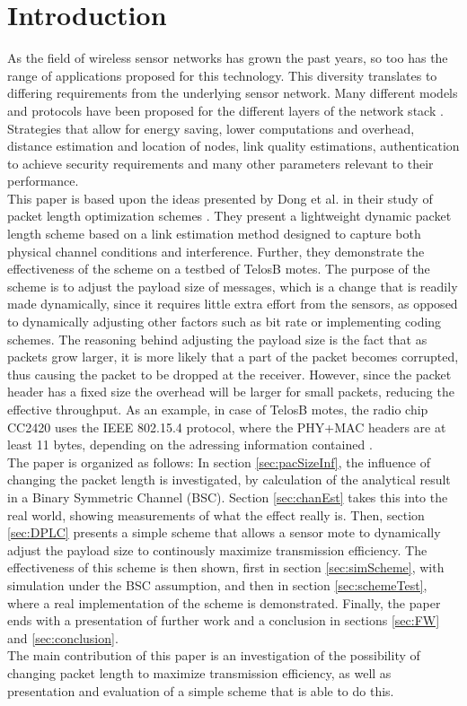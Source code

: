 \section{Introduction}\label{sec:intro}
As the field of wireless sensor networks has grown the past years, so too has the range of applications proposed for this technology. This diversity translates to differing requirements from the underlying sensor network. Many different models and protocols have been proposed for the different layers of the
network stack \cite{WSNpaper}. Strategies that allow for energy saving, lower computations  and overhead, distance estimation and location of nodes, link quality estimations, authentication to achieve security requirements and many other parameters relevant to their performance.
\\[8pt]
This paper is based upon the ideas presented by Dong et al. in their study of packet length optimization schemes \cite{DPLCpaper}. They present a lightweight dynamic packet length scheme based on a link estimation method designed to capture both physical channel conditions and interference. Further, they demonstrate the effectiveness of the scheme on a testbed of TelosB motes. The purpose of the scheme is to adjust the payload size of messages, which is a change that is readily made dynamically, since it requires little extra effort from the sensors, as opposed to dynamically adjusting other factors such as bit rate or implementing coding schemes. The reasoning behind adjusting the payload size is the fact that as packets grow larger, it is more likely that a part of the packet becomes corrupted, thus causing the packet to be dropped at the receiver. However, since the packet header has a fixed size the overhead will be larger for small packets, reducing the effective throughput. As an example, in case of TelosB motes, the radio chip CC2420 uses the IEEE 802.15.4 protocol, where the PHY+MAC headers are at least 11 bytes, depending on the adressing information contained \cite{CC2420}.
\\[8pt]
The paper is organized as follows: In section \ref{sec:pacSizeInf}, the influence of changing the packet length is investigated, by calculation of the analytical result in a Binary Symmetric Channel (BSC). Section \ref{sec:chanEst} takes this into the real world, showing measurements of what the effect really is. Then, section \ref{sec:DPLC} presents a simple scheme that allows a sensor mote to dynamically adjust the payload size to continously maximize transmission efficiency. The effectiveness of this scheme is then shown, first in section \ref{sec:simScheme}, with simulation under the BSC assumption, and then in section \ref{sec:schemeTest}, where a real implementation of the scheme is demonstrated. Finally, the paper ends with a presentation of further work and a conclusion in sections \ref{sec:FW} and \ref{sec:conclusion}.
\\[8pt]
The main contribution of this paper is an investigation of the possibility of changing packet length to maximize transmission efficiency, as well as presentation and evaluation of a simple scheme that is able to do this.
